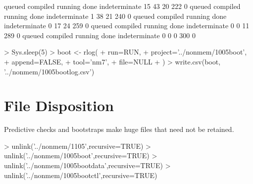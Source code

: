 \begin{Schunk}
\begin{Soutput}
       queued      compiled       running          done indeterminate 
           15            43            20           222             0 
       queued      compiled       running          done indeterminate 
            1            38            21           240             0 
       queued      compiled       running          done indeterminate 
            0            17            24           259             0 
       queued      compiled       running          done indeterminate 
            0             0            11           289             0 
       queued      compiled       running          done indeterminate 
            0             0             0           300             0 
\end{Soutput}
\begin{Sinput}
> Sys.sleep(5)
> boot <- rlog(
+ 	run=RUN,
+ 	project='../nonmem/1005boot',
+ 	append=FALSE,
+ 	tool='nm7',
+   file=NULL
+ )
> write.csv(boot, '../nonmem/1005bootlog.csv')
\end{Sinput}
\end{Schunk}
\section{File Disposition}
Predictive checks and bootstraps make huge files that need not be retained.
\begin{Schunk}
\begin{Sinput}
> unlink('../nonmem/1105',recursive=TRUE)
> unlink('../nonmem/1005boot',recursive=TRUE)
> unlink('../nonmem/1005bootdata',recursive=TRUE)
> unlink('../nonmem/1005bootctl',recursive=TRUE)
\end{Sinput}
\end{Schunk}

